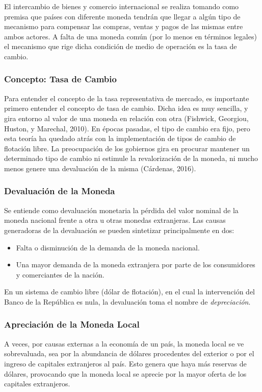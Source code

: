 \begin{spacing}{1.5}
El intercambio de bienes y comercio internacional se realiza tomando como premisa que países con diferente moneda tendrán que llegar a algún tipo de mecanismo para compensar las compras, ventas y pagos de las mismas entre ambos actores. A falta de una moneda común (por lo menos en términos legales) el mecanismo que rige dicha condición de medio de operación es la tasa de cambio.

\subsubsection{Concepto: Tasa de Cambio}
Para entender el concepto de la tasa representativa de mercado, es importante primero entender el concepto de tasa de cambio. Dicha idea es muy sencilla, y gira entorno al valor de una moneda en relación con otra (Fishwick, Georgiou, Huston, y Marechal, 2010). En épocas pasadas, el tipo de cambio era fijo, pero esta teoría ha quedado atrás con la implementación de tipos de cambio de flotación libre. La preocupación de los gobiernos gira en procurar mantener un determinado tipo de cambio ni estimule la revalorización de la moneda, ni mucho menos genere una devaluación de la misma (Cárdenas, 2016). 

\subsubsection{Devaluación de la Moneda} 
Se entiende como devaluación monetaria la pérdida del valor nominal de la moneda nacional frente a otra u otras monedas extranjeras. Las causas generadoras de la devaluación se pueden sintetizar principalmente en dos:

\begin{itemize}
	\item Falta o disminución de la demanda de la moneda nacional.
	\item Una mayor demanda de la moneda extranjera por parte de los consumidores y comerciantes de la nación.
\end{itemize}

En un sistema de cambio libre (dólar de flotación), en el cual la intervención del Banco de la República es nula, la devaluación toma el nombre de \textit{depreciación}. 

\subsubsection{Apreciación de la Moneda Local}
A veces, por causas externas a la economía de un país, la moneda local se ve sobrevaluada, sea por la abundancia de dólares procedentes del exterior o por el ingreso de capitales extranjeros al país. Esto genera que haya más reservas de dólares, provocando que la moneda local se aprecie por la mayor oferta de los capitales extranjeros. 


\end{spacing}
